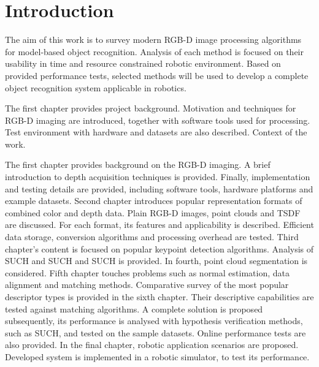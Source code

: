 \chapter*{Introduction}
\label{cha:introduction}



The aim of this work is to survey modern RGB-D image processing algorithms for model-based object recognition. Analysis of each method is focused on their usability in time and resource constrained robotic environment. Based on provided performance tests, selected methods will be used to develop a complete object recognition system applicable in robotics.

The first chapter provides project background. Motivation and techniques for RGB-D imaging are introduced, together with software tools used for processing. Test environment with hardware and datasets are also described. Context of the work.



The first chapter provides background on the RGB-D imaging. A brief introduction to depth acquisition techniques is provided.
Finally, implementation and testing details are provided, including software tools, hardware platforms and example datasets. %
Second chapter introduces popular representation formats of combined color and depth data. Plain RGB-D images, point clouds and TSDF are discussed. For each format, its features and applicability is described. Efficient data storage, conversion algorithms and processing overhead are tested. %
Third chapter's content is focused on popular keypoint detection algorithms. Analysis of SUCH and SUCH and SUCH is provided.
In fourth, point cloud segmentation is considered.
Fifth chapter touches problems such as normal estimation, data alignment and matching methods. Comparative survey of the most popular descriptor types is provided in the sixth chapter. Their descriptive capabilities are tested against matching algorithms. A complete solution is proposed subsequently, its performance is analysed with hypothesis verification methods, such as SUCH, and tested on the sample datasets. Online performance tests are also provided.
In the final chapter, robotic application scenarios are proposed. %
Developed system is implemented in a robotic simulator, to test its performance.

